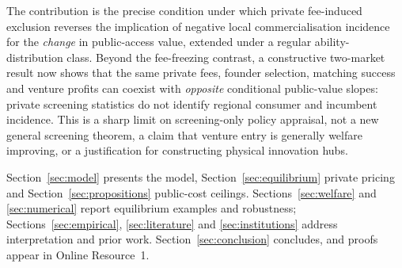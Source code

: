 The contribution is the precise condition under which private fee-induced exclusion reverses the implication of negative local commercialisation incidence for the \emph{change} in public-access value, extended under a regular ability-distribution class. Beyond the fee-freezing contrast, a constructive two-market result now shows that the same private fees, founder selection, matching success and venture profits can coexist with \emph{opposite} conditional public-value slopes: private screening statistics do not identify regional consumer and incumbent incidence. This is a sharp limit on screening-only policy appraisal, not a new general screening theorem, a claim that venture entry is generally welfare improving, or a justification for constructing physical innovation hubs.

Section~\ref{sec:model} presents the model, Section~\ref{sec:equilibrium} private pricing and Section~\ref{sec:propositions} public-cost ceilings. Sections~\ref{sec:welfare} and \ref{sec:numerical} report equilibrium examples and robustness; Sections~\ref{sec:empirical}, \ref{sec:literature} and \ref{sec:institutions} address interpretation and prior work. Section~\ref{sec:conclusion} concludes, and proofs appear in Online Resource~1.
